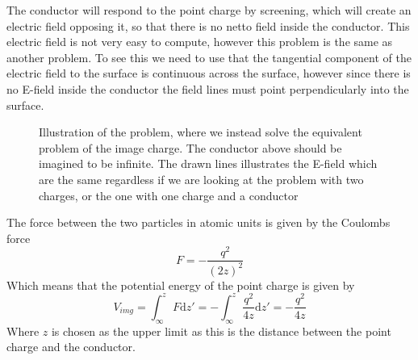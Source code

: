\begin{solution}
The conductor will respond to the point charge by screening, which will create an electric field opposing it, so that there is no netto field inside the conductor. This electric field is not very easy to compute, however this problem is the same as another problem. To see this we need to use that the tangential component of the electric field to the surface is continuous across the surface, however since there is no E-field inside the conductor the field lines must point perpendicularly into the surface.


\begin{figure}[!ht]
    \centering
    \caption{Illustration of the problem, where we instead solve the equivalent problem of the image charge. The conductor above should be imagined to be infinite. The drawn lines illustrates the E-field which are the same regardless if we are looking at the problem with two charges, or the one with one charge and a conductor}
    \label{fig:ImageCharge}
\end{figure}
The force between the two particles in atomic units is given by the Coulombs force
\begin{equation}
    F = - \frac{q^2}{(2z)^2}
\end{equation}
Which means that the potential energy of the point charge is given by
\begin{equation}
    V_{img} = \int_{\infty}^z F \mathrm{d}z' = -\int_{\infty}^z \frac{q^2}{4z} \mathrm{d}z' = -\frac{q^2}{4z}
\end{equation}
Where $z$ is chosen as the upper limit as this is the distance between the point charge and the conductor.
\end{solution}



